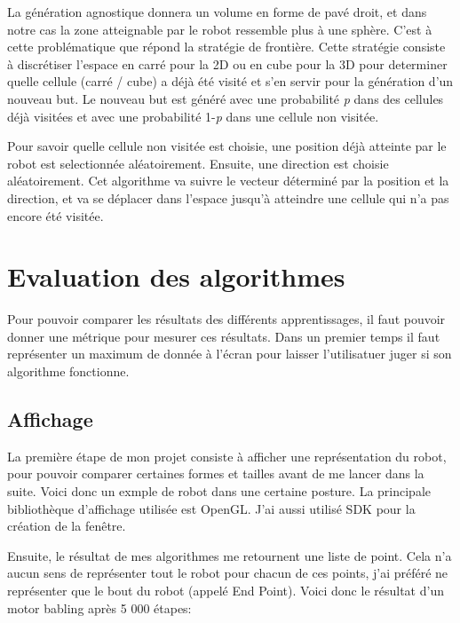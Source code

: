 \documentclass[11pt,french]{article}
\begin{document}
La génération agnostique donnera un volume en forme de pavé droit, et dans notre cas la zone atteignable par le robot ressemble plus à une sphère. C'est à cette problématique que répond la stratégie de frontière. Cette stratégie consiste à discrétiser l'espace en carré pour la 2D ou en cube pour la 3D pour determiner quelle cellule (carré / cube)  a déjà été visité et s'en servir pour la génération d'un nouveau but. Le nouveau but est généré avec une probabilité \emph{p} dans des cellules déjà visitées et avec une probabilité 1-\emph{p} dans une cellule non visitée.

Pour savoir quelle cellule non visitée est choisie, une position déjà atteinte par le robot est selectionnée aléatoirement. Ensuite, une direction est choisie aléatoirement. Cet algorithme va suivre le vecteur déterminé par la position et la direction, et va se déplacer dans l'espace jusqu'à atteindre une cellule qui n'a pas encore été visitée.

\section{Evaluation des algorithmes}

Pour pouvoir comparer les résultats des différents apprentissages, il faut pouvoir donner une métrique pour mesurer ces résultats. Dans un premier temps il faut représenter un maximum de donnée à l'écran pour laisser l'utilisatuer juger si son algorithme fonctionne.

\subsection{Affichage}

La première étape de mon projet consiste à afficher une représentation du robot, pour pouvoir comparer certaines formes et tailles avant de me lancer dans la suite. Voici donc un exmple de robot dans une certaine posture. La principale bibliothèque d'affichage utilisée est OpenGL. J'ai aussi utilisé SDK pour la création de la fenêtre.


Ensuite, le résultat de mes algorithmes me retournent une liste de point. Cela n'a aucun sens de représenter tout le robot pour chacun de ces points, j'ai préféré ne représenter que le bout du robot (appelé End Point). Voici donc le résultat d'un motor babling après 5 000 étapes:

\end{document}
